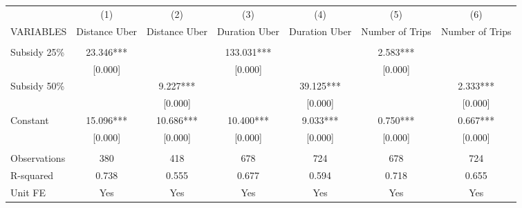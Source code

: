\begin{tabular}{lcccccc} \hline
 & (1) & (2) & (3) & (4) & (5) & (6) \\
VARIABLES & Distance Uber & Distance Uber & Duration Uber & Duration Uber & Number of Trips & Number of Trips \\ \hline
 &  &  &  &  &  &  \\
Subsidy 25\% & 23.346*** &  & 133.031*** &  & 2.583*** &  \\
 & [0.000] &  & [0.000] &  & [0.000] &  \\
Subsidy 50\% &  & 9.227*** &  & 39.125*** &  & 2.333*** \\
 &  & [0.000] &  & [0.000] &  & [0.000] \\
Constant & 15.096*** & 10.686*** & 10.400*** & 9.033*** & 0.750*** & 0.667*** \\
 & [0.000] & [0.000] & [0.000] & [0.000] & [0.000] & [0.000] \\
 &  &  &  &  &  &  \\
Observations & 380 & 418 & 678 & 724 & 678 & 724 \\
R-squared & 0.738 & 0.555 & 0.677 & 0.594 & 0.718 & 0.655 \\
 Unit FE & Yes & Yes & Yes & Yes & Yes & Yes \\ \hline
\end{tabular}

